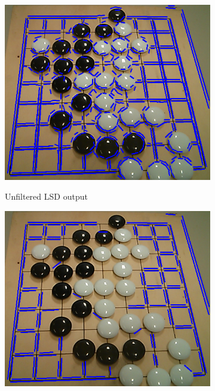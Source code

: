 	\begin{figure}
		\begin{subfigure}{0.23\textwidth}
			\includegraphics[width=\textwidth]{images/lsd_first.png}
			\label{fig:lsdPostprocessingFirst}
			\caption{Unfiltered LSD output}
		\end{subfigure}
		\hfill
		\begin{subfigure}{0.23\textwidth}
			\includegraphics[width=\textwidth]{images/lsd_length.png}
			\label{fig:lsdPostprocessingLength}

\end{subfigure}
\end{figure}
